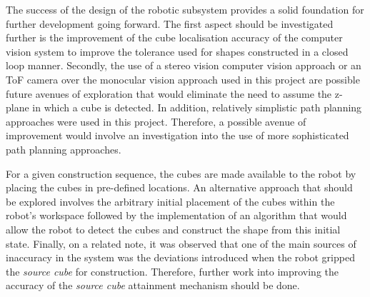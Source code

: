The success of the design of the robotic subsystem provides a solid foundation for further development going forward. The first aspect should be investigated further is the improvement of the cube localisation accuracy of the computer vision system to improve the tolerance used for shapes constructed in a closed loop manner. Secondly, the use of a stereo vision computer vision approach or an ToF camera over the monocular vision approach used in this project are possible future avenues of exploration that would eliminate the need to assume the z-plane in which a cube is detected. In addition, relatively simplistic path planning approaches were used in this project. Therefore, a possible avenue of improvement would involve an investigation into the use of more sophisticated path planning approaches. 

For a given construction sequence, the cubes are made available to the robot by placing the cubes in pre-defined locations. An alternative approach that should be explored involves the arbitrary initial placement of the cubes within the robot's workspace followed by the implementation of an algorithm that would allow the robot to detect the cubes and construct the shape from this initial state. Finally, on a related note, it was observed that one of the main sources of inaccuracy in the system was the deviations introduced when the robot gripped the \textit{source cube} for construction. Therefore, further work into improving the accuracy of the \textit{source cube} attainment mechanism should be done.

\newpage



